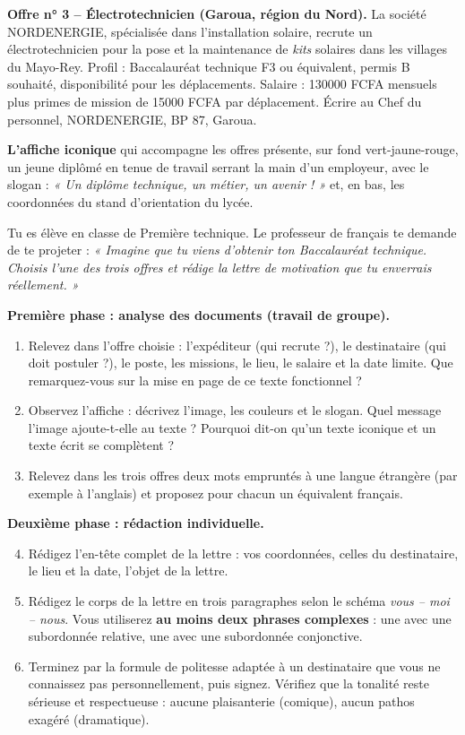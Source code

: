 \documentclass[11pt]{article}
\newcounter{popsec}
\newcounter{popsub}
\newcommand{\courssub}[1]{%
  \stepcounter{popsub}%
  \par\vspace{9pt}\noindent{\popxbold\fontsize{11.5}{13}\selectfont\color{popink}{\color{poporange}\thepopsec.\thepopsub}\hspace{6pt}#1}\par\nopagebreak\vspace{4pt}
}
\begin{document}
\textbf{Offre n° 3 -- Électrotechnicien (Garoua, région du Nord).}
La société NORDENERGIE, spécialisée dans l'installation solaire, recrute un électrotechnicien pour la pose et la maintenance de \emph{kits} solaires dans les villages du Mayo-Rey. Profil : Baccalauréat technique F3 ou équivalent, permis B souhaité, disponibilité pour les déplacements. Salaire : \num{130000} FCFA mensuels plus primes de mission de \num{15000} FCFA par déplacement. Écrire au Chef du personnel, NORDENERGIE, BP 87, Garoua.

\textbf{L'affiche iconique} qui accompagne les offres présente, sur fond vert-jaune-rouge, un jeune diplômé en tenue de travail serrant la main d'un employeur, avec le slogan : \emph{« Un diplôme technique, un métier, un avenir ! »} et, en bas, les coordonnées du stand d'orientation du lycée.

Tu es élève en classe de Première technique. Le professeur de français te demande de te projeter : \emph{« Imagine que tu viens d'obtenir ton Baccalauréat technique. Choisis l'une des trois offres et rédige la lettre de motivation que tu enverrais réellement. »}

\courssub{Consignes}

\textbf{Première phase : analyse des documents (travail de groupe).}

\begin{enumerate}
\item Relevez dans l'offre choisie : l'expéditeur (qui recrute ?), le destinataire (qui doit postuler ?), le poste, les missions, le lieu, le salaire et la date limite. Que remarquez-vous sur la mise en page de ce texte fonctionnel ?
\item Observez l'affiche : décrivez l'image, les couleurs et le slogan. Quel message l'image ajoute-t-elle au texte ? Pourquoi dit-on qu'un texte iconique et un texte écrit se complètent ?
\item Relevez dans les trois offres deux mots empruntés à une langue étrangère (par exemple à l'anglais) et proposez pour chacun un équivalent français.
\end{enumerate}

\textbf{Deuxième phase : rédaction individuelle.}

\begin{enumerate}
\setcounter{enumi}{3}
\item Rédigez l'en-tête complet de la lettre : vos coordonnées, celles du destinataire, le lieu et la date, l'objet de la lettre.
\item Rédigez le corps de la lettre en trois paragraphes selon le schéma \emph{vous -- moi -- nous}. Vous utiliserez \textbf{au moins deux phrases complexes} : une avec une subordonnée relative, une avec une subordonnée conjonctive.
\item Terminez par la formule de politesse adaptée à un destinataire que vous ne connaissez pas personnellement, puis signez. Vérifiez que la tonalité reste sérieuse et respectueuse : aucune plaisanterie (comique), aucun pathos exagéré (dramatique).
\end{enumerate}
\end{document}
